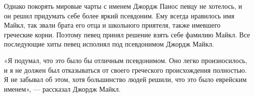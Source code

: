 Однако покорять мировые чарты с именем Джордж Панос певцу не хотелось, и он решил придумать себе более яркий псевдоним. Ему всегда нравилось имя Майкл, так звали брата его отца и школьного приятеля, также имевшего греческие корни. Поэтому певец принял решение взять себе фамилию Майкл. Все последующие хиты певец исполнял под псевдонимом Джордж Майкл.

«Я подумал, что это было бы отличным псевдонимом. Оно легко произносилось, и я не должен был отказываться от своего греческого происхождения полностью. Я не забывал об этом, хотя большинство людей решили, что это было еврейским именем», --- рассказал Джордж Майкл.